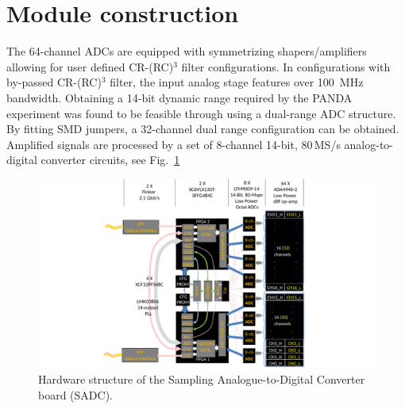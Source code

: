 \documentclass[12pt,a4paper, twocolumn]{article}
\newcommand{\Reffig}[1]{Fig.~\ref{#1}}
\begin{document}
\section{Module construction}
The 64-channel ADCs are equipped with symmetrizing shapers/amplifiers allowing for user defined CR-(RC)$^3$ filter configurations. In configurations with by-passed CR-(RC)$^3$ filter, the input analog stage features over \SI{100}{\mega\hertz} bandwidth. Obtaining a 14-bit dynamic range required by the PANDA experiment was found to be feasible through using a dual-range ADC structure. By fitting SMD jumpers, a 32-channel dual range configuration can be obtained.
Amplified signals are processed by a set of 8-channel 14-bit, 80\,MS/s analog-to-digital converter circuits, see \Reffig{fig:sadc:structure} 

\begin{figure}[htb]
\includegraphics[width=\linewidth, trim={120 0 120 0}, clip]{fig/hardware.pdf}
\caption{Hardware structure of the \panda  Sampling Analogue-to-Digital Converter board (SADC).}
\label{fig:sadc:structure}
\end{figure}
\end{document}
